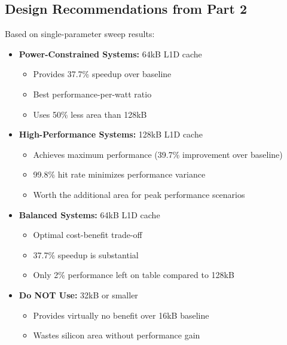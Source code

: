 \documentclass[11pt,a4paper]{article}
\begin{document}
\subsection{Design Recommendations from Part 2}

Based on single-parameter sweep results:

\begin{itemize}[noitemsep]
    \item \textbf{Power-Constrained Systems:} 64kB L1D cache
    \begin{itemize}[noitemsep]
        \item Provides 37.7\% speedup over baseline
        \item Best performance-per-watt ratio
        \item Uses 50\% less area than 128kB
    \end{itemize}

    \item \textbf{High-Performance Systems:} 128kB L1D cache
    \begin{itemize}[noitemsep]
        \item Achieves maximum performance (39.7\% improvement over baseline)
        \item 99.8\% hit rate minimizes performance variance
        \item Worth the additional area for peak performance scenarios
    \end{itemize}

    \item \textbf{Balanced Systems:} 64kB L1D cache
    \begin{itemize}[noitemsep]
        \item Optimal cost-benefit trade-off
        \item 37.7\% speedup is substantial
        \item Only 2\% performance left on table compared to 128kB
    \end{itemize}

    \item \textbf{Do NOT Use:} 32kB or smaller
    \begin{itemize}[noitemsep]
        \item Provides virtually no benefit over 16kB baseline
        \item Wastes silicon area without performance gain
    \end{itemize}
\end{itemize}

\newpage
\end{document}
